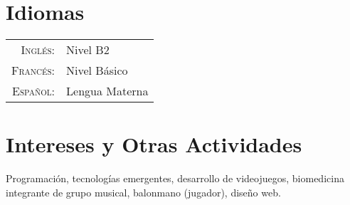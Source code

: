 \documentclass[a4paper,10pt]{article} %
\begin{document}

\section{Idiomas}

\begin{tabular}{rl}
\textsc{Inglés:} & Nivel B2\\

\textsc{Francés:} & Nivel Básico\\

\textsc{Español:} & Lengua Materna\\
\end{tabular}



\section{Intereses y Otras Actividades}


Programación, tecnologías emergentes, desarrollo de videojuegos,
biomedicina\\
integrante de grupo musical, balonmano (jugador), diseño web.

\end{document}
